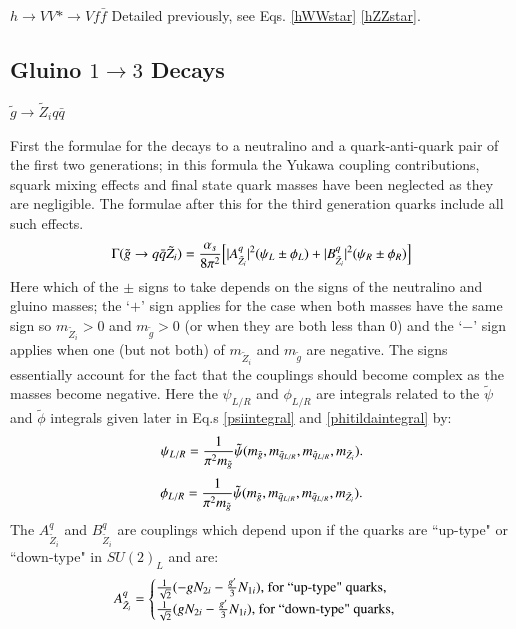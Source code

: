 \documentclass[final,3p,times,pdflatex]{elsarticle}
\begin{document}
\textbf{\underline{$h \rightarrow VV* \rightarrow V f \bar{f}$}}
Detailed previously, see Eqs. \eqref{hWWstar} \eqref{hZZstar}.

\subsection{Gluino $1 \rightarrow 3$ Decays}

\underline{$\tilde{g} \rightarrow \tilde{Z}_i q \bar{q}$}

First the formulae for the decays to a neutralino and a quark-anti-quark pair of the first two generations; in this formula the Yukawa coupling contributions, squark mixing effects and final state quark masses have been neglected as they are negligible. The formulae after this for the third generation quarks include all such effects.
\begin{equation} \label{gqqneut}
\Gamma(\tilde{g} \rightarrow q \bar{q} \tilde{Z}_i) = {\alpha_s \over 8 \pi^2 }\Big[|A_{{\tilde{Z}_i}}^{q}|^2 (\psi_{L} \pm \phi_{L}) + |B_{{\tilde{Z}_i}}^{q}|^2 (\psi_{R} \pm \phi_{R})\Big]
\end{equation}
Here which of the $\pm$ signs to take depends on the signs of the neutralino and gluino masses; the `$+$' sign applies for the case when both masses have the same sign so $m_{\tilde{Z}_i} > 0$ and $m_{\tilde{g}} > 0$ (or when they are both less than 0) and the `$-$' sign applies when one (but not both) of $m_{\tilde{Z}_i}$ and $m_{\tilde{g}}$ are negative. The signs essentially account for the fact that the couplings should become complex as the masses become negative.
Here the $\psi_{L/R}$ and $\phi_{L/R}$ are integrals related to the $\tilde{\psi}$ and $\tilde{\phi}$ integrals given later in Eq.s \eqref{psiintegral} and \eqref{phitildaintegral} by:
\begin{equation}
\psi_{L/R} = {1 \over \pi^2 m_{\tilde{g}}} \tilde{\psi}(m_{\tilde{g}},m_{\tilde{q}_{L/R}},m_{\tilde{q}_{L/R}},m_{\tilde{Z}_i}).
\end{equation}
\begin{equation}
\phi_{L/R} = {1 \over \pi^2 m_{\tilde{g}}} \tilde{\psi}(m_{\tilde{g}},m_{\tilde{q}_{L/R}},m_{\tilde{q}_{L/R}},m_{\tilde{Z}_i}).
\end{equation}
The $A_{{\tilde{Z}_i}}^{q}$ and $B_{{\tilde{Z}_i}}^{q}$ are couplings which depend upon if the quarks are ``up-type" or ``down-type" in $SU(2)_L$ and are:
\begin{equation}
A_{{\tilde{Z}_i}}^{q} = \begin{cases} 
						{1 \over \sqrt{2}} (-gN_{2i} - {g' \over 3}N_{1i})$, for ``up-type" quarks,$ \\
						{1 \over \sqrt{2}} (gN_{2i} - {g' \over 3}N_{1i})$, for ``down-type" quarks,$
						\end{cases}
\end{equation}
\end{document}

